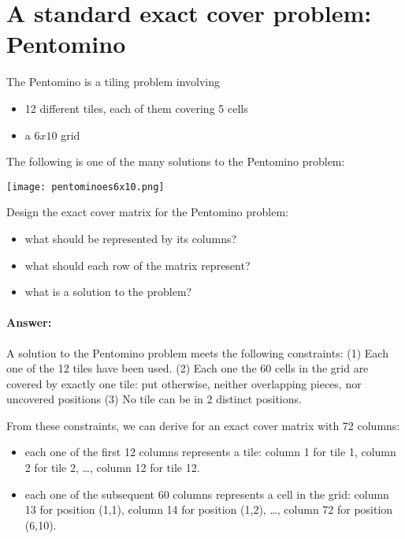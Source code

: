 \documentclass[table]{article}
\begin{document}
\vspace{1em}

\section{A standard exact cover problem: Pentomino}

The Pentomino is a tiling problem involving
\begin{itemize}
\item 12 different tiles, each of them covering 5 cells
\item a $6x10$ grid
\end{itemize}

The following is one of the many solutions to the Pentomino problem:
\vspace{1em}

\begin{center}
\texttt{[image: pentominoes6x10.png]}
\end{center}

\vspace{1em}

Design the exact cover matrix for the Pentomino problem:
\begin{itemize}
	\item what should be represented by its columns?
	\item what should each row of the matrix represent?
	\item what is a solution to the problem?
\end{itemize}

\paragraph{Answer:} A solution to the Pentomino problem meets the following constraints:
	(1) Each one of the 12 tiles have been used.
	(2) Each one the 60 cells in the grid are covered by exactly one tile: put otherwise, neither overlapping pieces, nor uncovered positions
	(3) No tile can be in 2 distinct positions.

From these constraints, we can derive for an exact cover matrix with 72 columns:
\begin{itemize}
	\item each one of the first 12 columns represents a tile: column 1 for tile 1, column 2 for tile 2, \ldots, column 12 for tile 12.
	\item each one of the subsequent 60 columns represents a cell in the grid: column 13 for position (1,1), column 14 for position (1,2), \ldots, column 72 for position (6,10).
\end{itemize}
\end{document}
